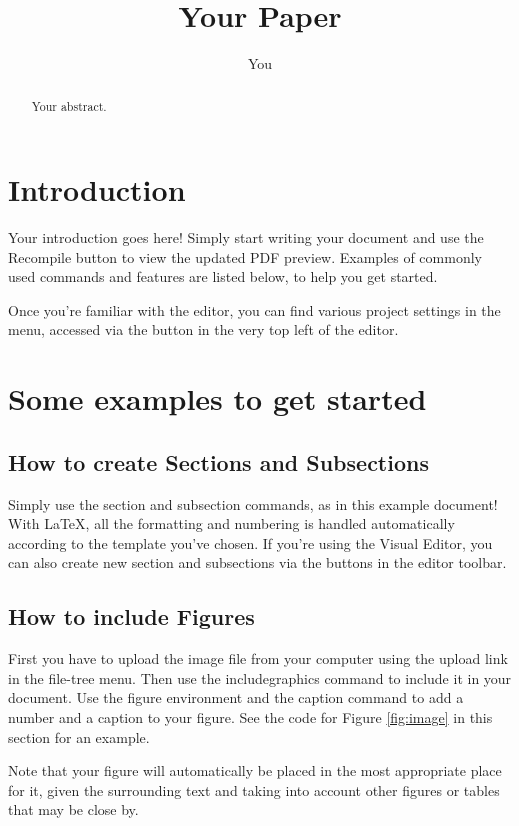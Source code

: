 \documentclass{article}
\title{Your Paper}
\author{You}
\begin{document}
\maketitle

\begin{abstract}
Your abstract.
\end{abstract}

\section{Introduction}

Your introduction goes here! Simply start writing your document and use the Recompile button to view the updated PDF preview. Examples of commonly used commands and features are listed below, to help you get started.

Once you're familiar with the editor, you can find various project settings in the menu, accessed via the button in the very top left of the editor.

\section{Some examples to get started}

\subsection{How to create Sections and Subsections}

Simply use the section and subsection commands, as in this example document! With \LaTeX{}, all the formatting and numbering is handled automatically according to the template you've chosen. If you're using the Visual Editor, you can also create new section and subsections via the buttons in the editor toolbar.

\subsection{How to include Figures}

First you have to upload the image file from your computer using the upload link in the file-tree menu. Then use the includegraphics command to include it in your document. Use the figure environment and the caption command to add a number and a caption to your figure. See the code for Figure \ref{fig:image} in this section for an example.

Note that your figure will automatically be placed in the most appropriate place for it, given the surrounding text and taking into account other figures or tables that may be close by.
\end{document}
